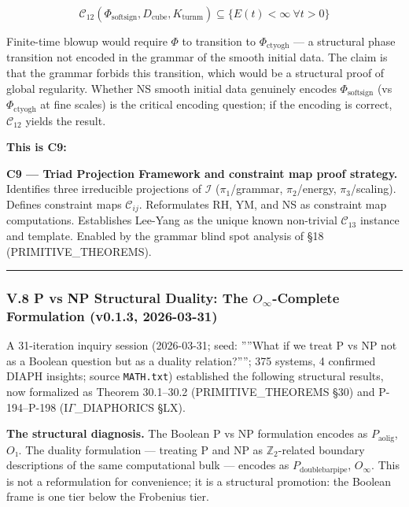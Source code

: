 \documentclass[12pt,a4paper]{article}
\newcommand{\pilcrow}{\S}
\begin{document}
\[\mathcal{C}_{12}(\Phi_{\text{softsign}}, D_\text{cube}, K_{\text{turnm}}) \subseteq \{ E(t) < \infty\ \forall t > 0 \}\]

Finite-time blowup would require $\Phi$ to transition to $\Phi_{\text{ctyogh}}$ --- a structural phase transition not encoded in the grammar of the smooth initial data. The claim is that the grammar forbids this transition, which would be a structural proof of global regularity. Whether NS smooth initial data genuinely encodes $\Phi_{\text{softsign}}$ (vs $\Phi_{\text{ctyogh}}$ at fine scales) is the critical encoding question; if the encoding is correct, $\mathcal{C}_{12}$ yields the result.

\textbf{This is C9:}

\textbf{C9 --- Triad Projection Framework and constraint map proof strategy.} Identifies three irreducible projections of $\mathcal{I}$ ($\pi_1$/grammar, $\pi_2$/energy, $\pi_3$/scaling). Defines constraint maps $\mathcal{C}_{ij}$. Reformulates RH, YM, and NS as constraint map computations. Establishes Lee-Yang as the unique known non-trivial $\mathcal{C}_{13}$ instance and template. Enabled by the grammar blind spot analysis of \pilcrow{}18 (PRIMITIVE\_THEOREMS).

\begin{center}
\rule{0.5\textwidth}{0.4pt}
\end{center}

\subsubsection{V.8 P vs NP Structural Duality: The $O_{\infty}$-Complete Formulation (v0.1.3, 2026-03-31)}

A 31-iteration inquiry session (2026-03-31; seed: ''''What if we treat P vs NP not as a Boolean question but as a duality relation?''''; 375 systems, 4 confirmed DIAPH insights; source \texttt{MATH.txt}) established the following structural results, now formalized as Theorem 30.1--30.2 (PRIMITIVE\_THEOREMS \pilcrow{}30) and P-194--P-198 (I$\Gamma$\_DIAPHORICS \pilcrow{}LX).

\textbf{The structural diagnosis.} The Boolean P vs NP formulation encodes as $P_{\text{aolig}}$, $O₁$. The duality formulation --- treating P and NP as $\mathbb{Z}_2$-related boundary descriptions of the same computational bulk --- encodes as $P_{\text{doublebarpipe}}$, $O_{\infty}$. This is not a reformulation for convenience; it is a structural promotion: the Boolean frame is one tier below the Frobenius tier.
\end{document}
